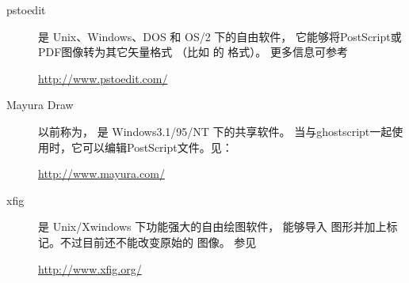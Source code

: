 \begin{description}
	\item[pstoedit]
	
	 是 Unix、Windows、DOS 和 OS/2 下的自由软件，
	它能够将PostScript或PDF图像转为其它矢量格式
	（比如 的 格式）。
	更多信息可参考
	\begin{center}
		\url{http://www.pstoedit.com/}
	\end{center}

	\item[Mayura Draw]
	
	 以前称为，
	是 Windows3.1/95/NT 下的共享软件。
	当与ghostscript一起使用时，它可以编辑PostScript文件。见：
	\begin{center}
		\url{http://www.mayura.com/}
	\end{center}
	
	\item[xfig]
	
	 是 Unix/Xwindows 下功能强大的自由绘图软件，
	能够导入  图形并加上标记。不过目前还不能改变原始的 图像。
	参见
	\begin{center}
		\url{http://www.xfig.org/}
	\end{center}
	
\end{description}

\clearpage
\endinput
